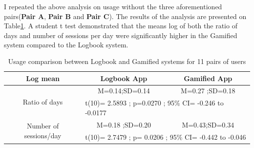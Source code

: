 I repeated the above analysis on usage without the three aforementioned pairs(\textbf{Pair A}, \textbf{Pair B} and \textbf{Pair C}). The results of the analysis are presented on Table\ref{table:usagewellness2}. A student t test demonstrated that the means log of both  the ratio of days and number of sessions per day were significantly higher in the Gamified system compared to the Logbook system.
\newline 
\begin{table}[h!]
  \begin{center}
    \caption{Usage comparison between Logbook and Gamified systems for 11 pairs of users}
    \label{table:usagewellness2}
	\begin{tabular}{|c|c|c|}
		\hline
		Log mean &Logbook App&Gamified App\\
		\hline
		 \multirow{2}{*}{Ratio of days}&M=0.14;SD=0.14&M=0.27 ;SD=0.18\\\cline{2-3} 

		 &\multicolumn{2}{|l|}{t(10)= 2.5893 ; p=0.0270 ; 95\% CI= -0.246 to -0.0177} \\
\hline
   		 \multirow{2}{*}{ Number of sessions/day}&M=0.18 ;SD=0.20&M=0.43;SD=0.34\\\cline{2-3} 
		
		 &\multicolumn{2}{|l|}{t(10)= 2.7479 ; p= 0.0206 ; 95\% CI=  -0.442 to -0.046 } \\
\hline
	\end{tabular}
  \end{center}
\end{table}
\newline  

